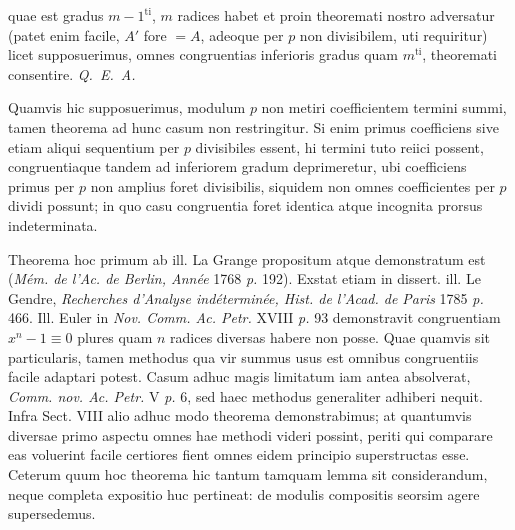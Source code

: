 \noindent quae est gradus $m-1^{\mathrm{ti}}$, $m$ radices habet et proin theoremati nostro adversatur (patet enim facile, $A'$ fore $=A$, adeoque per $p$ non divisibilem, uti requiritur) licet supposuerimus, omnes congruentias inferioris gradus quam $m^{\mathrm{ti}}$, theoremati consentire. \mbox{\emph{Q. E. A.}}



Quamvis hic supposuerimus, modulum $p$ non metiri coefficientem termini summi, tamen theorema ad hunc casum non restringitur. Si enim primus coefficiens sive etiam aliqui sequentium per $p$ divisibiles essent, hi termini tuto reiici possent, congruentiaque tandem ad inferiorem gradum deprimeretur, ubi coefficiens primus per $p$ non amplius foret divisibilis, siquidem non omnes coefficientes per $p$ dividi possunt; in quo casu congruentia foret identica atque incognita prorsus indeterminata.

Theorema hoc primum ab ill. La Grange propositum atque demonstratum est (\emph{M\'em. de l'Ac. de Berlin, Ann\'ee} 1768 \emph{p.} 192). Exstat etiam in dissert. ill. Le Gendre, \emph{Recherches d'Analyse ind\'etermin\'ee, Hist. de l'Acad. de Paris} 1785 \emph{p.} 466. Ill. Euler in \emph{Nov. Comm. Ac. Petr.} XVIII \emph{p.} 93 demonstravit congruentiam $x^n-1\equiv0$ plures quam $n$ radices diversas habere non posse. Quae quamvis sit particularis, tamen methodus qua vir summus usus est omnibus congruentiis facile adaptari potest. Casum adhuc magis limitatum iam antea absolverat, \emph{Comm. nov. Ac. Petr.} V \emph{p.} 6, sed haec methodus generaliter adhiberi nequit. Infra Sect. VIII alio adhuc modo theorema demonstrabimus; at quantumvis diversae primo aspectu omnes hae methodi videri possint, periti qui comparare eas voluerint facile certiores fient omnes eidem principio superstructas esse. Ceterum quum hoc theorema hic tantum tamquam lemma sit considerandum, neque completa expositio huc pertineat: de modulis compositis seorsim agere supersedemus.

